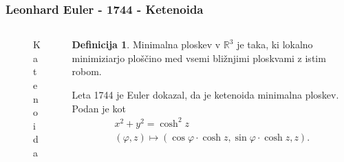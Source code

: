 \documentclass[8pt]{beamer}
\newcommand{\samplescalar}{50} %
\theoremstyle{definition}
\newtheorem{definicija}{Definicija}
\theoremstyle{remark}
\theoremstyle{plain}
\numberwithin{equation}{section}  %
\begin{document}
\begin{frame}
    \frametitle{Leonhard Euler - 1744 - Ketenoida}
    \begin{columns}
        \begin{column}{0.5\textwidth}
            \centering
            \begin{figure}[H]
                \centering
            
                \caption{Katenoida}
            \end{figure}

        \end{column}

        \begin{column}{0.5\textwidth}
            \begin{definicija}
                Minimalna ploskev v $\mathbb{R}^3$ je taka, ki \textcolor{red1}{lokalno minimiziarjo ploščino} med vsemi bližnjimi ploskvami z istim robom.
            \end{definicija}
            Leta 1744 je Euler dokazal, da je ketenoida minimalna ploskev. Podan je kot
            \begin{gather*}
                x^2+y^2=\cosh^2{z} \\
                (\varphi, z) \mapsto(\cos \varphi \cdot \cosh z, \sin \varphi \cdot \cosh z, z).
            \end{gather*}


\end{column}
\end{columns}
\end{frame}
\end{document}
